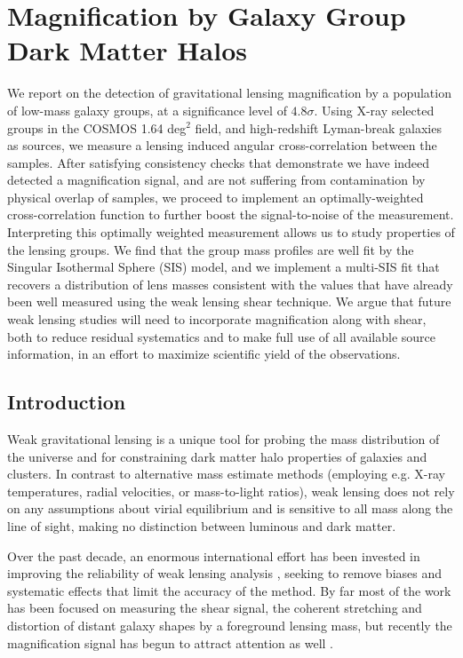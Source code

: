 
\chapter{Magnification by Galaxy Group Dark Matter Halos}
\label{ch2}

We report on the detection of gravitational lensing magnification by a population of low-mass galaxy groups, at a significance level of $4.8 \sigma$.  Using X-ray selected groups in the COSMOS 1.64 deg$^2$ field, and high-redshift Lyman-break galaxies as sources, we measure a lensing induced angular cross-correlation between the samples.  After satisfying consistency checks that demonstrate we have indeed detected a magnification signal, and are not suffering from contamination by physical overlap of samples, we proceed to implement an optimally-weighted cross-correlation function to further boost the signal-to-noise of the measurement. Interpreting this optimally weighted measurement allows us to study properties of the lensing groups.  We find that the group mass profiles are well fit by the Singular Isothermal Sphere (SIS) model, and we implement a multi-SIS fit that recovers a distribution of lens masses consistent with the values that have already been well measured using the weak lensing shear technique.  We argue that future weak lensing studies will need to incorporate magnification along with shear, both to reduce residual systematics and to make full use of all available source information, in an effort to maximize scientific yield of the observations.


\section{Introduction}
Weak gravitational lensing is a unique tool for probing the mass distribution of the universe and for constraining dark matter halo properties of galaxies and clusters.  In contrast to alternative mass estimate methods (employing e.g. X-ray temperatures, radial velocities, or mass-to-light ratios), weak lensing does not rely on any assumptions about virial equilibrium and is sensitive to all mass along the line of sight, making no distinction between luminous and dark matter.  

Over the past decade, an enormous international effort has been invested in improving the reliability of weak lensing analysis \citep{step1, step2, great08, great10}, seeking to remove biases and systematic effects that limit the accuracy of the method.  By far most of the work has been focused on measuring the shear signal, the coherent stretching and distortion of distant galaxy shapes by a foreground lensing mass, but recently the magnification signal has begun to attract attention as well \citep{Scranton05, Hildebrandt09b, Hildebrandt11, LHJM10, Umetsu11}.  

